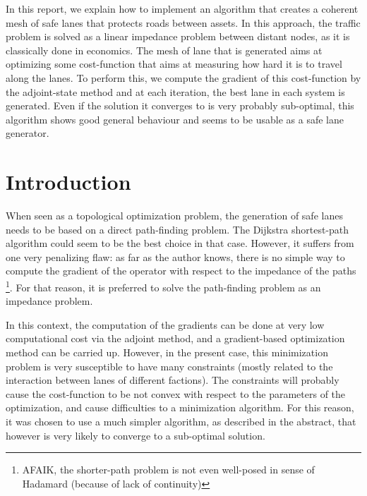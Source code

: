 \documentclass[11pt,a4paper]{article}  %
\begin{document}
\begin{center}
\end{center}

In this report, we explain how to implement an algorithm that creates a coherent mesh of safe lanes that protects roads between assets. In this approach, the traffic problem is solved as a linear impedance problem between distant nodes, as it is classically done in economics. The mesh of lane that is generated aims at optimizing some cost-function that aims at measuring how hard it is to travel along the lanes. To perform this, we compute the gradient of this cost-function by the adjoint-state method and at each iteration, the best lane in each system is generated. Even if the solution it converges to is very probably sub-optimal, this algorithm shows good general behaviour and seems to be usable as a safe lane generator.

\section{Introduction}

When seen as a topological optimization problem, the generation of safe lanes needs to be based on a direct path-finding problem. The Dijkstra shortest-path algorithm could seem to be the best choice in that case. However, it suffers from one very penalizing flaw: as far as the author knows, there is no simple way to compute the gradient of the operator with respect to the impedance of the paths \footnote{AFAIK, the shorter-path problem is not even well-posed in sense of Hadamard (because of lack of continuity)}. For that reason, it is preferred to solve the path-finding problem as an impedance problem.

In this context, the computation of the gradients can be done at very low computational cost via the adjoint method, and a gradient-based optimization method can be carried up. However, in the present case, this minimization problem is very susceptible to have many constraints (mostly related to the interaction between lanes of different factions). The constraints will probably cause the cost-function to be not convex with respect to the parameters of the optimization, and cause difficulties to a minimization algorithm. For this reason, it was chosen to use a much simpler algorithm, as described in the abstract, that however is very likely to converge to a sub-optimal solution.
\end{document}

